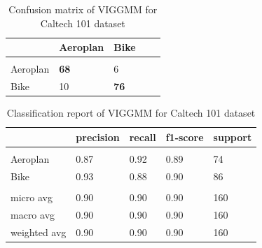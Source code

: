 \documentclass[letterpaper]{article}
\begin{document}
\begin{table}[h]
    \caption{Confusion matrix of VIGGMM for Caltech 101 dataset}
    \label{confusion caltech binary}
    \begin{center}
        \begin{tabular}{lllll}
            \multicolumn{1}{c}{\bf }  &\multicolumn{1}{c}{\bf Aeroplan}&\multicolumn{1}{c}{\bf Bike}   \\
            \hline \\
            Aeroplan          &\textbf{68} &6\\
            Bike             &10  &\textbf{76}\\
            
            \end{tabular}
        
    \end{center}
    \end{table}
    \begin{table}
        \caption{Classification report of VIGGMM for Caltech 101 dataset}
        \label{classification report  caltech binary}
        \centering
        \resizebox{\columnwidth}{!}
        {%
        \begin{tabular}{lllll}
            \multicolumn{1}{c}{\bf }  &\multicolumn{1}{c}{\bf precision}&\multicolumn{1}{c}{\bf recall}&\multicolumn{1}{c}{\bf f1-score} &\multicolumn{1}{c}{\bf support}   \\
            \hline \\
            Aeroplan          &0.87 &0.92&0.89&74 \\
            Bike              &0.93  &0.88&0.90&86\\\\
            
            micro avg             &0.90  &0.90&0.90&160\\
            macro avg             &0.90  &0.90&0.90&160\\
            weighted avg             &0.90  &0.90&0.90&160\\
            \end{tabular}
        }
    \end{table}
\end{document}

